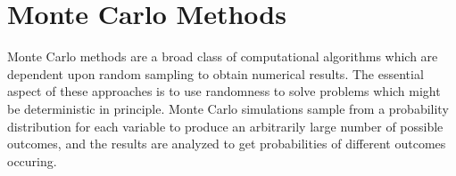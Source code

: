 \section{Monte Carlo Methods}

Monte Carlo methods are a broad class of computational algorithms which are dependent upon random sampling to obtain numerical results.
The essential aspect of these approaches is to use randomness to solve problems which might be deterministic in principle.
Monte Carlo simulations sample from a probability distribution for each variable to produce an arbitrarily large number of possible outcomes, and  the results are analyzed to get probabilities of different outcomes occuring.
